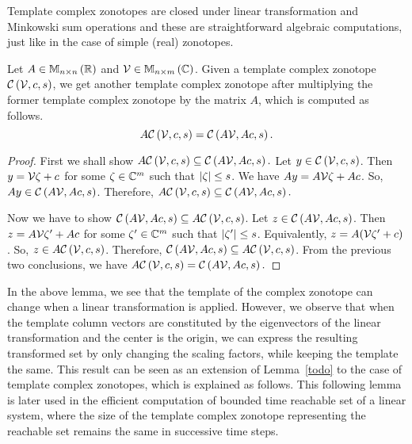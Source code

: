 Template complex zonotopes are closed under linear transformation and
Minkowski sum operations and these are straightforward algebraic
computations, just like in the case of simple (real) zonotopes.
%
\begin{lemma}
Let $A\in\mathbb{M}_{n\times n}\left(\mathbb{R}\right)$ and $\mathcal{V}\in\mathbb{M}_{n\times m}\left(\mathbb{C}\right)$.
Given a template complex zonotope $\mathit{\mathcal{C}}\left(\mathcal{V},c,s\right)$, we
get another template complex zonotope after multiplying the former
template complex zonotope by the matrix $A$, which is computed as
follows. 
%
\begin{equation}
A\mathit{\mathcal{C}}\left(\mathcal{V},c,s\right)=\mathit{\mathcal{C}}\left(A\mathcal{V},Ac,s\right).
\end{equation}
%
\end{lemma}
%
\begin{proof}
First we shall show
$A\mathit{\mathcal{C}}\left(\mathcal{V},c,s\right)\subseteq\mathit{\mathcal{C}}\left(A\mathcal{V},Ac,s\right).$
Let $y\in\mathit{\mathcal{C}}\left(\mathcal{V},c,s\right)$.  Then $y=\mathcal{V}\zeta+c$
for some $\zeta\in\mathbb{C}^m$ such that
$\left|\zeta\right|\leq s$.  We have $Ay=A\mathcal{V}\zeta+Ac$.  So,
$Ay\in\mathit{\mathcal{C}}\left(A\mathcal{V},Ac,s\right)$.  Therefore,
$A\mathit{\mathcal{C}}\left(\mathcal{V},c,s\right)\subseteq\mathit{\mathcal{C}}\left(A\mathcal{V},Ac,s\right).$
 
Now we have to show $\mathit{\mathcal{C}}\left(A\mathcal{V},Ac,s\right)\subseteq
A\mathit{\mathcal{C}}\left(\mathcal{V},c,s\right)$.  Let
$z\in\mathit{\mathcal{C}}\left(A\mathcal{V},Ac,s\right)$.  Then $z=A\mathcal{V}\zeta^\prime+Ac$
for some $\zeta^\prime\in\mathbb{C}^m$ such that
$\left|\zeta^\prime\right|\leq s$.  Equivalently, $z=
A(\mathcal{V}\zeta^\prime+c)$.  So, $z\in
A\mathit{\mathcal{C}}\left(\mathcal{V},c,s\right)$.  Therefore, $\mathit{\mathcal{C}}\left(A\mathcal{V},Ac,s\right)\subseteq
A\mathit{\mathcal{C}}\left(\mathcal{V},c,s\right)$.
From the previous two conclusions, we have
$A\mathit{\mathcal{C}}\left(\mathcal{V},c,s\right)=\mathit{\mathcal{C}}\left(A\mathcal{V},Ac,s\right).$
\end{proof}
%
In the above lemma, we see that the template of the complex zonotope
can change when a linear transformation is applied.  However, we
observe that when the template column vectors are constituted by the
eigenvectors of the linear transformation and the center is the
origin, we can express the resulting transformed set by only changing
the scaling factors, while keeping the template the same.  This result
can be seen as an extension of Lemma~\ref{todo} to the case of
template complex zonotopes, which is explained as follows.  This
following lemma is later used in the efficient computation of bounded
time reachable set of a linear system, where the size of the template
complex zonotope representing the reachable set remains the same in
successive time steps.
%
\begin{lemma}

\end{lemma}
%

